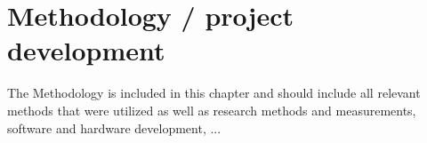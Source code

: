 \clearpage\section{Methodology / project development}

{The Methodology is included in this chapter and should include all relevant methods that were utilized as well as research methods and measurements, software and hardware development, ...}

